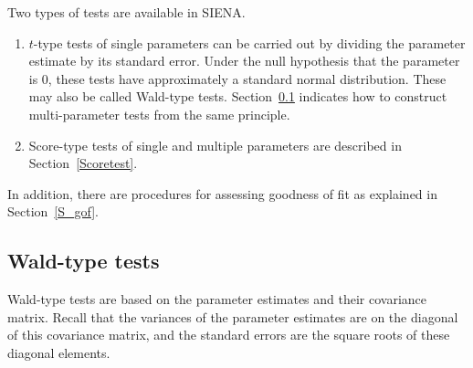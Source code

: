 \documentclass[a4paper,fleqn,11pt]{article}
\newcommand{\+}{\, + \,}
\newcommand{\si}{{\sf SIENA}}
\begin{document}
Two types of tests are available in \si.
\begin{enumerate}
\item $t$-type tests of single parameters can be carried out by
dividing the parameter estimate by its standard error.
Under the null hypothesis that the parameter is 0,
these tests have approximately a standard normal distribution.
These may also be called Wald-type tests.
Section~\ref{Waldtest} indicates how to construct multi-parameter tests
from the same principle.

\item Score-type tests of single and multiple parameters
      are described in Section~\ref{Scoretest}.

\end{enumerate}
In addition, there are procedures for assessing goodness of fit
as explained in Section~\ref{S_gof}.

\subsection{Wald-type tests}
\label{Waldtest}

Wald-type tests are based on the parameter estimates
and their covariance matrix.
Recall that the variances of the parameter estimates
are on the diagonal of this covariance matrix, and
the standard errors are the square roots of these diagonal
elements.
\end{document}

